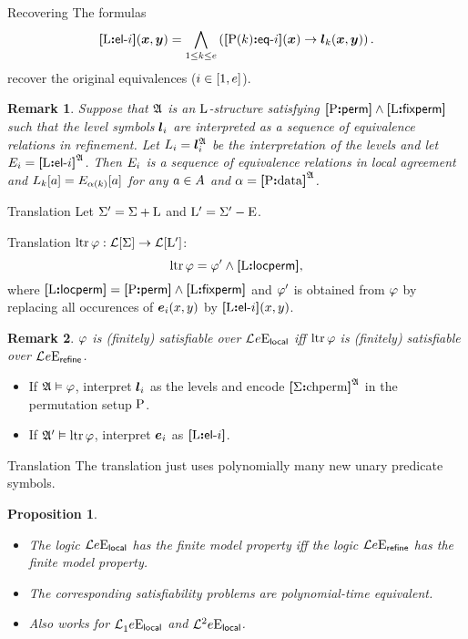 \documentclass{beamer}
\newtheorem{remark}{Remark}
\newtheorem{proposition}{Proposition}
\begin{document}
\begin{frame}{Recovering}
The formulas
\[
  {\bm{[}{\mathrm{L}}\mathord{\bm{:}}\mathsf{el}{\hbox{-}}i\bm{]}}(\bm{x},\bm{y}) = \bigwedge_{1 \leq k \leq e}
  \left({\bm{[}{\mathrm{P}}(k)\mathord{\bm{:}}\mathsf{eq}{\hbox{-}}i\bm{]}}(\bm{x}) \rightarrow \bm{l}_{k}(\bm{x},\bm{y})\right).
\]
recover the original equivalences ($i\in[1,e]$).
\begin{remark}
Suppose that $\mathfrak{A}$ is an ${\mathrm{L}}$-structure satisfying
${\bm{[}{\mathrm{P}}\mathord{\bm{:}}\mathsf{perm}\bm{]}}\land{\bm{[}{\mathrm{L}}\mathord{\bm{:}}\mathsf{fixperm}\bm{]}}$ such that the level symbols $\bm{l}_{i}$ are
interpreted as a sequence of equivalence relations in refinement.
Let $L_{i} = \bm{l}_{i}^{\mathfrak{A}}$ be the interpretation of the levels and let
$E_{i} = {\bm{[}{\mathrm{L}}\mathord{\bm{:}}\mathsf{el}{\hbox{-}}i\bm{]}}^{\mathfrak{A}}$.
Then $E_{i}$ is a sequence of equivalence relations in local agreement and
$L_{k}[a] = E_{\alpha(k)}[a]$ for any $a\in A$ and $\alpha =
{\bm{[}{\mathrm{P}}\mathord{\bm{:}}\mathrm{data}\bm{]}}^{\mathfrak{A}}$.
\end{remark}
\end{frame}

\begin{frame}{Translation}
Let $\Sigma' = \Sigma + {\mathrm{L}}$ and ${\mathrm{L}}' = \Sigma' - {\mathrm{E}}$.

Translation $\operatorname{ltr}\varphi : \mathcal{L}[\Sigma] \to \mathcal{L}[{{\mathrm{L}}'}]$:
\[
  \operatorname{ltr}\varphi = {\varphi'} \land {\bm{[}{\mathrm{L}}\mathord{\bm{:}}\mathsf{locperm}\bm{]}},
\]
where
${\bm{[}{\mathrm{L}}\mathord{\bm{:}}\mathsf{locperm}\bm{]}} = {\bm{[}{\mathrm{P}}\mathord{\bm{:}}\mathsf{perm}\bm{]}} \land {\bm{[}{\mathrm{L}}\mathord{\bm{:}}\mathsf{fixperm}\bm{]}}$
and ${\varphi'}$ is obtained from $\varphi$ by replacing all occurences
of $\bm{e}_{i}(x,y)$ by ${\bm{[}{\mathrm{L}}\mathord{\bm{:}}\mathsf{el}{\hbox{-}}i\bm{]}}(x,y)$.
\begin{remark}
$\varphi$ is (finitely) satisfiable over $\mathcal{L}^{{}}_{{}}{e}\mathrm{E}_{\mathsf{local}}$ iff
$\operatorname{ltr}\varphi$ is (finitely) satisfiable over
$\mathcal{L}^{{}}_{{}}{e}\mathrm{E}_{\mathsf{refine}}$.
\end{remark}
\begin{itemize}
  \item If $\mathfrak{A}\vDash\varphi$, interpret $\bm{l}_{i}$ as the levels and encode
  ${\bm{[}\Sigma\mathord{\bm{:}}\mathrm{chperm}\bm{]}}^{\mathfrak{A}}$ in the permutation setup ${\mathrm{P}}$.
  \item If $\mathfrak{A'}\vDash\operatorname{ltr}\varphi$, interpret $\bm{e}_{i}$ as ${\bm{[}{\mathrm{L}}\mathord{\bm{:}}\mathsf{el}{\hbox{-}}i\bm{]}}$.
\end{itemize}
\end{frame}

\begin{frame}{Translation}
The translation just uses polynomially many new unary predicate symbols.
\begin{proposition}
\begin{itemize}
  \item The logic $\mathcal{L}{e}\mathrm{E}_{\mathsf{local}}$ has the finite model property iff
  the logic $\mathcal{L}{e}\mathrm{E}_{\mathsf{refine}}$ has the finite model property.
  \item The corresponding satisfiability problems are polynomial-time
  equivalent.
  \item Also works for $\mathcal{L}^{{}}_{1}{e}\mathrm{E}_{\mathsf{local}}$ and
  $\mathcal{L}^{2}_{{}}{e}\mathrm{E}_{\mathsf{local}}$.
\end{itemize}
\end{proposition}
\end{frame}
\end{document}
